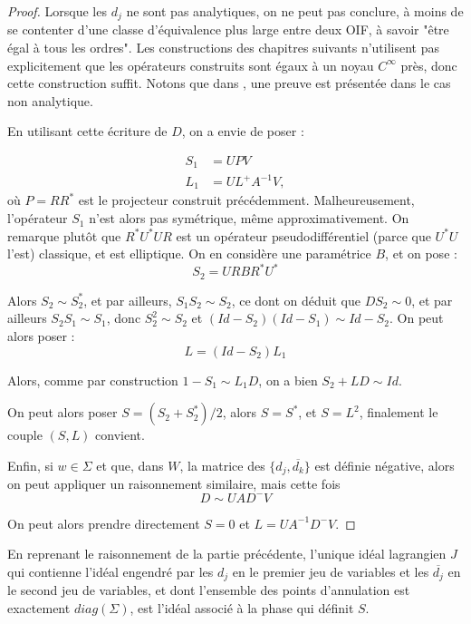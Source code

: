 \begin{proof}
  Lorsque les $d_j$ ne sont pas analytiques, on ne peut pas conclure, à moins de se contenter d'une classe d'équivalence plus large entre deux OIF, à savoir "être égal à tous les ordres". Les constructions des chapitres suivants n'utilisent pas explicitement que les opérateurs construits sont égaux à un noyau $C^{\infty}$ près, donc cette construction suffit. Notons que dans \cite{BoutetdeMonvel1974-1975}, une preuve est présentée dans le cas non analytique.
  
  En utilisant cette écriture de $D$, on a envie de poser :
  
  \begin{align*}
    S_1 &= UPV\\
    L_1 &= UL^+A^{-1}V,
  \end{align*}
où $P=RR^*$ est le projecteur construit précédemment. Malheureusement, l'opérateur $S_1$ n'est alors pas symétrique, même approximativement. On remarque plutôt que $R^*U^*UR$ est un opérateur pseudodifférentiel (parce que $U^*U$ l'est) classique, et est elliptique. On en considère une paramétrice $B$, et on pose :
  \begin{equation*}
    S_2=URBR^*U^*
  \end{equation*}
  
  Alors $S_2 \sim S_2^*$, et par ailleurs, $S_1S_2 \sim S_2$, ce dont on déduit que $DS_2 \sim 0$, et par ailleurs $S_2S_1 \sim S_1$, donc $S_2^2 \sim S_2$ et $(Id-S_2)(Id-S_1) \sim Id-S_2$. On peut alors poser :
  \begin{equation*}
    L=(Id-S_2)L_1
  \end{equation*}
  
  Alors, comme par construction $1-S_1 \sim L_1D$, on a bien $S_2 + LD \sim Id$.
  
  On peut alors poser $S=(S_2+S_2^*)/2$, alors $S=S^*$, et $S=L^2$, finalement le couple $(S,L)$ convient.
  
  Enfin, si $w \in \Sigma$ et que, dans $W$, la matrice des $\{d_j,\overline{d_k}\}$ est définie négative, alors on peut appliquer un raisonnement similaire, mais cette fois
  \begin{equation*}
    D \sim UAD^-V
  \end{equation*}
  
  On peut alors prendre directement $S=0$ et $L=UA^{-1}D^-V$.
  \end{proof}
  
  En reprenant le raisonnement de la partie précédente, l'unique idéal lagrangien $J$ qui contienne l'idéal engendré par les $d_j$ en le premier jeu de variables et les $\overline{d_j}$ en le second jeu de variables, et dont l'ensemble des points d'annulation est exactement $diag(\Sigma)$, est l'idéal associé à la phase qui définit $S$.
